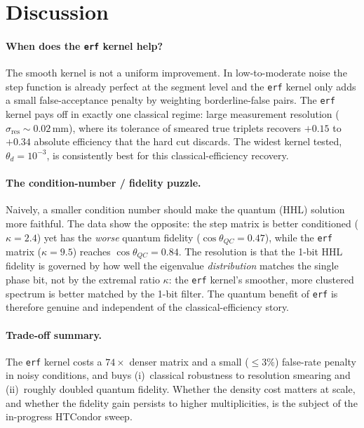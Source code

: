 \documentclass[11pt,a4paper]{article}
\newcommand{\thd}{\theta_d}
\newcommand{\sres}{\sigma_{\mathrm{res}}}
\newcommand{\cosQC}{\cos\theta_{QC}}
\begin{document}
\section{Discussion}
\label{sec:discussion}

\paragraph{When does the \texttt{erf} kernel help?}
The smooth kernel is not a uniform improvement. In low-to-moderate noise the step function
is already perfect at the segment level and the \texttt{erf} kernel only adds a small
false-acceptance penalty by weighting borderline-false pairs. The \texttt{erf} kernel pays
off in exactly one classical regime: large measurement resolution
($\sres\sim0.02\,\mathrm{mm}$), where its tolerance of smeared true triplets recovers
$+0.15$ to $+0.34$ absolute efficiency that the hard cut discards. The widest kernel
tested, $\thd=10^{-3}$, is consistently best for this classical-efficiency recovery.

\paragraph{The condition-number / fidelity puzzle.}
Naively, a smaller condition number should make the quantum (HHL) solution more faithful.
The data show the opposite: the step matrix is better conditioned ($\kappa=2.4$) yet has
the \emph{worse} quantum fidelity ($\cosQC=0.47$), while the \texttt{erf} matrix
($\kappa=9.5$) reaches $\cosQC=0.84$. The resolution is that the 1-bit HHL fidelity is
governed by how well the eigenvalue \emph{distribution} matches the single phase bit, not
by the extremal ratio $\kappa$: the \texttt{erf} kernel's smoother, more clustered
spectrum is better matched by the 1-bit filter. The quantum benefit of \texttt{erf} is
therefore genuine and independent of the classical-efficiency story.

\paragraph{Trade-off summary.}
The \texttt{erf} kernel costs a $74\times$ denser matrix and a small ($\le3\%$)
false-rate penalty in noisy conditions, and buys (i)~classical robustness to resolution
smearing and (ii)~roughly doubled quantum fidelity. Whether the density cost matters at
scale, and whether the fidelity gain persists to higher multiplicities, is the subject of
the in-progress HTCondor sweep.
\end{document}

